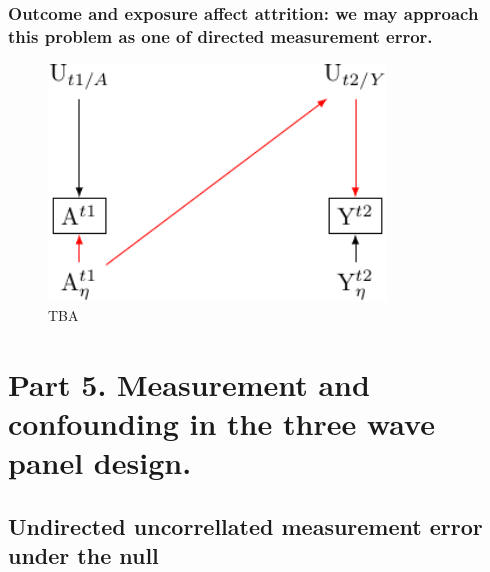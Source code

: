 \documentclass[
  singlecolumn]{report}
\begin{document}
\hypertarget{outcome-and-exposure-affect-attrition-we-may-approach-this-problem-as-one-of-directed-measurement-error.}{%
\subsubsection{Outcome and exposure affect attrition: we may approach
this problem as one of directed measurement
error.}\label{outcome-and-exposure-affect-attrition-we-may-approach-this-problem-as-one-of-directed-measurement-error.}}

\begin{figure}

{\centering \includegraphics[width=0.8\textwidth,height=\textheight]{causal-dags_files/figure-pdf/fig-directed-measurement-error-1.pdf}

}

\caption{\label{fig-directed-measurement-error}TBA}

\end{figure}

\hypertarget{part-5.-measurement-and-confounding-in-the-three-wave-panel-design.}{%
\section{Part 5. Measurement and confounding in the three wave panel
design.}\label{part-5.-measurement-and-confounding-in-the-three-wave-panel-design.}}

\hypertarget{undirected-uncorrellated-measurement-error-under-the-null}{%
\subsection{Undirected uncorrellated measurement error under the
null}\label{undirected-uncorrellated-measurement-error-under-the-null}}
\end{document}
